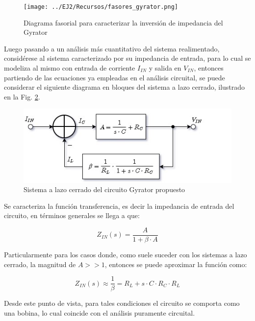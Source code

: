 \begin{figure}[H]
    \centering
    \texttt{[image: ../EJ2/Recursos/fasores\_gyrator.png]}
    \caption{Diagrama fasorial para caracterizar la inversi\'on de impedancia del Gyrator}
    \label{fig:fasores_gyrator}
\end{figure}

Luego pasando a un an\'alisis m\'as cuantitativo del sistema realimentado, consid\'erese al sistema caracterizado por su impedancia de entrada, para lo cual se modeliza al mismo con entrada de corriente $I_{IN}$ y salida en $V_{IN}$,
entonces partiendo de las ecuaciones ya empleadas en el an\'alisis circuital, se puede considerar el siguiente diagrama en bloques del sistema a lazo cerrado, ilustrado en la Fig. \ref{fig:sistema_gyrator}.

\begin{figure}[H]
    \centering
    \includegraphics[scale=0.7]{../EJ2/Recursos/sistema_gyrator.jpg}
    \caption{Sistema a lazo cerrado del circuito Gyrator propuesto}
    \label{fig:sistema_gyrator}
\end{figure}

Se caracteriza la funci\'on transferencia, es decir la impedancia de entrada del circuito, en t\'erminos generales se llega a que:

\begin{equation}
    Z_{IN}(s) = \frac{A}{1 + \beta \cdot A}
\end{equation}

Particularmente para los casos donde, como suele suceder con los sistemas a lazo cerrado, la magnitud de $A >> 1$, entonces se puede aproximar
la funci\'on como:

\begin{equation}
    Z_{IN}(s) \approx \frac{1}{\beta} = R_L + s \cdot C \cdot R_C \cdot R_L
\end{equation}

Desde este punto de vista, para tales condiciones el circuito se comporta como una bobina, lo cual coincide con el an\'alisis puramente circuital. 

